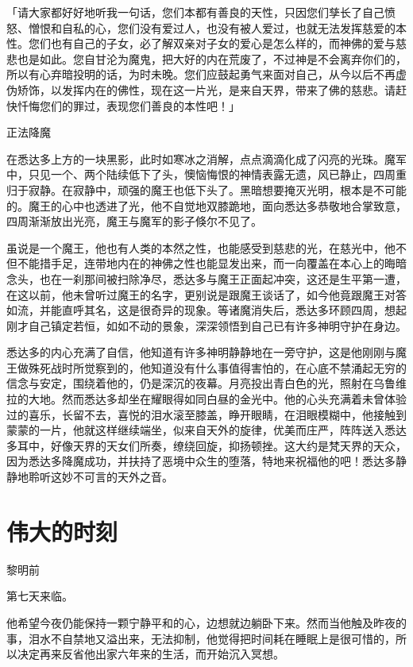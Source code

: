 \documentclass[12pt,twoside,openany]{book}
\begin{document}
「请大家都好好地听我一句话，您们本都有善良的天性，只因您们孳长了自己愤怒、憎恨和自私的心，您们没有爱过人，也没有被人爱过，也就无法发挥慈爱的本性。您们也有自己的子女，必了解双亲对子女的爱心是怎么样的，而神佛的爱与慈悲也是如此。您自甘沦为魔鬼，把大好的内在荒废了，不过神是不会离弃你们的，所以有心弃暗投明的话，为时未晚。您们应鼓起勇气来面对自己，从今以后不再虚伪矫饰，以发挥内在的佛性，现在这一片光，是来自天界，带来了佛的慈悲。请赶快忏悔您们的罪过，表现您们善良的本性吧！」

正法降魔

在悉达多上方的一块黑影，此时如寒冰之消解，点点滴滴化成了闪亮的光珠。魔军中，只见一个、两个陆续低下了头，懊恼悔恨的神情表露无遗，风已静止，四周重归于寂静。在寂静中，顽强的魔王也低下头了。黑暗想要掩灭光明，根本是不可能的。魔王的心中也透进了光，他不自觉地双膝跪地，面向悉达多恭敬地合掌致意，四周渐渐放出光亮，魔王与魔军的影子倏尔不见了。

虽说是一个魔王，他也有人类的本然之性，也能感受到慈悲的光，在慈光中，他不但不能措手足，连带地内在的神佛之性也能显发出来，而一向覆盖在本心上的晦暗念头，也在一刹那间被扫除净尽，悉达多与魔王正面起冲突，这还是生平第一遭，在这以前，他未曾听过魔王的名字，更别说是跟魔王谈话了，如今他竟跟魔王对答如流，并能直呼其名，这是很奇异的现象。等诸魔消失后，悉达多环顾四周，想起刚才自己镇定若恒，如如不动的景象，深深领悟到自己已有许多神明守护在身边。

悉达多的内心充满了自信，他知道有许多神明静静地在一旁守护，这是他刚刚与魔王做殊死战时所觉察到的，他知道没有什么事值得害怕的，在心底不禁涌起无穷的信念与安定，围绕着他的，仍是深沉的夜幕。月亮投出青白色的光，照射在乌鲁维拉的大地。然而悉达多却坐在耀眼得如同白昼的金光中。他的心头充满着未曾体验过的喜乐，长留不去，喜悦的泪水滚至膝盖，睁开眼睛，在泪眼模糊中，他接触到蒙蒙的一片，他就这样继续端坐，似来自天外的旋律，优美而庄严，阵阵送入悉达多耳中，好像天界的天女们所奏，缭绕回旋，抑扬顿挫。这大约是梵天界的天众，因为悉达多降魔成功，并扶持了恶境中众生的堕落，特地来祝福他的吧！悉达多静静地聆听这妙不可言的天外之音。

\section{伟大的时刻}\label{sec1.16}

黎明前

第七天来临。

他希望今夜仍能保持一颗宁静平和的心，边想就边躺卧下来。然而当他触及昨夜的事，泪水不自禁地又溢出来，无法抑制，他觉得把时间耗在睡眠上是很可惜的，所以决定再来反省他出家六年来的生活，而开始沉入冥想。
\end{document}
